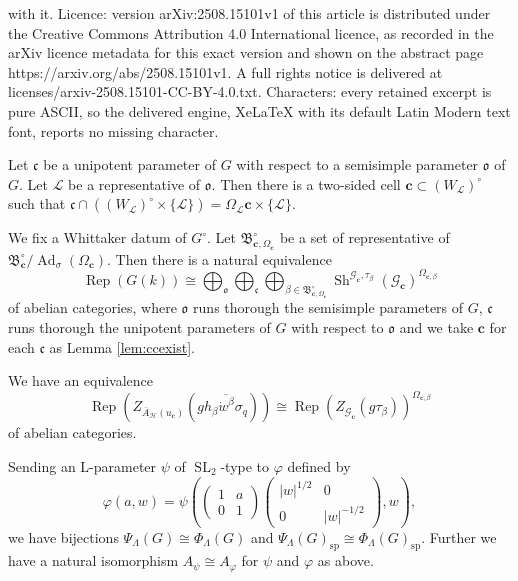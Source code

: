 \documentclass[10pt,a4paper]{amsart}
\DeclareMathOperator{\Ad}{Ad}
\DeclareMathOperator{\Rep}{Rep}
\DeclareMathOperator{\SL}{SL}
\DeclareMathOperator{\Sh}{Sh}
\newcommand{\mbf}{\mathbf}
\newcommand{\mc}{\mathcal}
\newcommand{\mf}{\mathfrak}
\newcommand{\mr}{\mathrm}
\newcommand{\ol}{\overline}
\begin{document}
with it. Licence: version arXiv:2508.15101v1 of this article is distributed under the Creative Commons Attribution 4.0 International licence, as recorded in the arXiv licence metadata for this exact version and shown on the abstract page https://arxiv.org/abs/2508.15101v1. A full rights notice is delivered at licenses/arxiv-2508.15101-CC-BY-4.0.txt. Characters: every retained excerpt is pure ASCII, so the delivered engine, XeLaTeX with its default Latin Modern text font, reports no missing character.
\begin{lem}\label{lem:ccexist}
	Let $\mf{c}$ be a unipotent parameter of $G$ with respect to a semisimple parameter $\mf{o}$ of $G$. 
	Let $\mc{L}$ be a representative of $\mf{o}$. 
	Then there is a two-sided cell 
	$\mbf{c} \subset (W_{\mc{L}})^{\circ}$ such that $\mf{c} \cap ((W_{\mc{L}})^{\circ} \times \{ \mc{L} \})=\Omega_{\mc{L}}  \mbf{c} \times \{\mc{L}\}$. 
\end{lem}

\begin{thm}\label{thm:RepGcateq}
	We fix a Whittaker datum of $G^{\circ}$. 
	Let $\mf{B}_{\mbf{c},\Omega_{\mbf{c}}}^{\circ}$ be a set of representative of 
	$\mf{B}_{\mbf{c}}^{\circ}/\Ad_{\sigma}(\Omega_{\mbf{c}})$. 
	Then there is a natural equivalence 
	\[
	\Rep (G(k)) \cong \bigoplus_{\mf{o}} \bigoplus_{\mf{c}}
	\bigoplus_{\beta \in \mf{B}_{\mbf{c},\Omega_{\mbf{c}}}^{\circ}} \Sh^{\mc{G}_{\mbf{c}},\tau_{\beta}}(\mc{G}_{\mbf{c}})^{\Omega_{\mbf{c},\beta}}
	\]
	of abelian categories, where $\mf{o}$ runs thorough the semisimple parameters of $G$, $\mf{c}$ runs thorough the unipotent parameters of $G$ with respect to $\mf{o}$ and 
	we take $\mbf{c}$ for each $\mf{c}$ as Lemma \ref{lem:ccexist}. 
\end{thm}

\begin{lem}\label{lem:ZquotOmega}
We have an equivalence  
\begin{equation}\label{eq:ZOmega}
	\Rep (Z_{\ol{A}_{\mc{H}}(u_{\mbf{c}})}(g \ol{h_{\beta} \dot{w}^{\beta} \sigma_q})) \cong \Rep (Z_{\mc{G}_{\mbf{c}}}(g \tau_{\beta}))^{\Omega_{\mbf{c},\beta}} 
\end{equation}
of abelian categories. 
\end{lem}

\begin{prop}\label{prop:bijSLWD}
Sending an L-parameter 
$\psi$ of $\SL_2$-type to $\varphi$ defined by 
\begin{equation}
 \varphi (a,w)=\psi \left( 
\begin{pmatrix}
1 & a \\ 0 & 1 
\end{pmatrix}
\begin{pmatrix}
\lvert w \rvert^{1/2} & 0 \\ 0 & \lvert w \rvert^{-1/2} 
\end{pmatrix}, w \right) , 
\end{equation}
we have bijections 
$\Psi_{\Lambda}(G) \cong \Phi_{\Lambda}(G)$ 
and 
$\Psi_{\Lambda}(G)_{\mr{sp}} \cong \Phi_{\Lambda}(G)_{\mr{sp}}$. 
Further we have a natural isomorphism 
$A_{\psi} \cong A_{\varphi}$ for $\psi$ and $\varphi$ as above. 
\end{prop}
\end{document}
